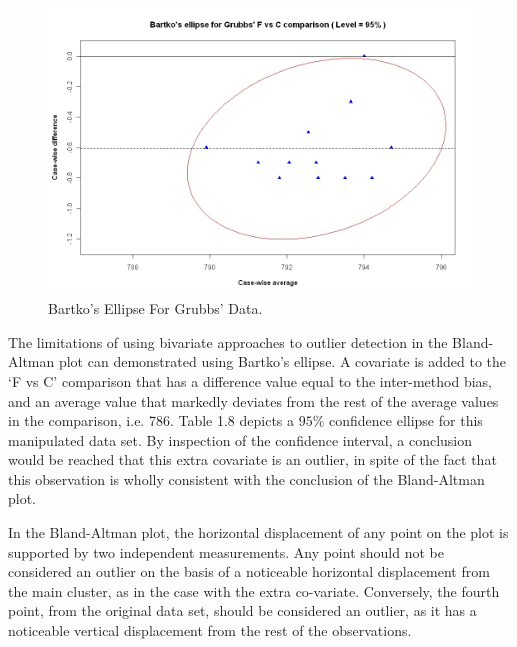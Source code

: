 \documentclass[12pt, a4paper]{report}
\theoremstyle{plain}
\theoremstyle{definition}
\theoremstyle{remark}
\begin{document}
		
		\begin{centering}
			\begin{figure}[h!]
				\includegraphics[width=130mm]{images/GrubbsBartko.jpeg}
				\caption{Bartko's Ellipse For Grubbs' Data.}
				\label{GrubbsBartko1}
			\end{figure}
		\end{centering}
		
		The limitations of using bivariate approaches to outlier detection
		in the Bland-Altman plot can demonstrated using Bartko's ellipse.
		A covariate is added to the `F vs C' comparison that has a
		difference value equal to the inter-method bias, and an average
		value that markedly deviates from the rest of the average values
		in the comparison, i.e. 786. Table 1.8 depicts a $95\%$ confidence
		ellipse for this manipulated data set. By inspection of the
		confidence interval, a conclusion would be reached that this extra
		covariate is an outlier, in spite of the fact that this
		observation is wholly consistent with the conclusion of the
		Bland-Altman plot.
		
		
		In the Bland-Altman plot, the horizontal displacement of any point on the plot is supported by two independent measurements. Any point should not be considered an outlier on the basis of a noticeable horizontal displacement from the main cluster, as in the case with the extra co-variate. Conversely, the fourth point, from the original data set, should be considered an
		outlier, as it has a noticeable vertical displacement from the rest of the observations.
			
\end{document}
